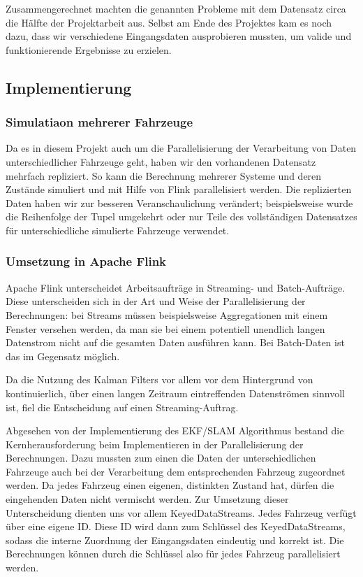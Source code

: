 \documentclass[11pt]{article}
\begin{document}
Zusammengerechnet machten die genannten Probleme mit dem Datensatz circa die Hälfte der Projektarbeit aus. Selbst am Ende des Projektes kam es noch dazu, dass wir verschiedene Eingangsdaten ausprobieren mussten, um valide und funktionierende Ergebnisse zu erzielen.

\subsection{Implementierung}

\subsubsection{Simulatiaon mehrerer Fahrzeuge}
Da es in diesem Projekt auch um die Parallelisierung der Verarbeitung von Daten unterschiedlicher Fahrzeuge geht, haben wir den vorhandenen Datensatz mehrfach repliziert. So kann die Berechnung mehrerer Systeme und deren Zustände simuliert und mit Hilfe von Flink parallelisiert werden. Die replizierten Daten haben wir zur besseren Veranschaulichung verändert; beispielsweise wurde die Reihenfolge der Tupel umgekehrt oder nur Teile des vollständigen Datensatzes für unterschiedliche simulierte Fahrzeuge verwendet.

\subsubsection{Umsetzung in Apache Flink}
Apache Flink unterscheidet Arbeitsaufträge in Streaming- und Batch-Auf\-trä\-ge. Diese unterscheiden sich in der Art und Weise der Parallelisierung der Berechnungen: bei Streams müssen beispielsweise Aggregationen mit einem Fenster versehen werden, da man sie bei einem potentiell unendlich langen Datenstrom nicht auf die gesamten Daten ausführen kann. Bei Batch-Daten ist das im Gegensatz möglich.

Da die Nutzung des Kalman Filters vor allem vor dem Hintergrund von kontinuierlich, über einen langen Zeitraum eintreffenden Datenströmen sinnvoll ist, fiel die Entscheidung auf einen Streaming-Auftrag.

Abgesehen von der Implementierung des EKF/SLAM Algorithmus bestand die Kernherausforderung beim Implementieren in der Parallelisierung der Berechnungen. Dazu mussten zum einen die Daten der unterschiedlichen Fahrzeuge auch bei der Verarbeitung dem entsprechenden Fahrzeug zugeordnet werden. Da jedes Fahrzeug einen eigenen, distinkten Zustand hat, dürfen die eingehenden Daten nicht vermischt werden. Zur Umsetzung dieser Unterscheidung dienten uns vor allem KeyedDataStreams. Jedes Fahrzeug verfügt über eine eigene ID. Diese ID wird dann zum Schlüssel des KeyedDataStreams, sodass die interne Zuordnung der Eingangsdaten eindeutig und korrekt ist. Die Berechnungen können durch die Schlüssel also für jedes Fahrzeug parallelisiert werden.
\end{document}
